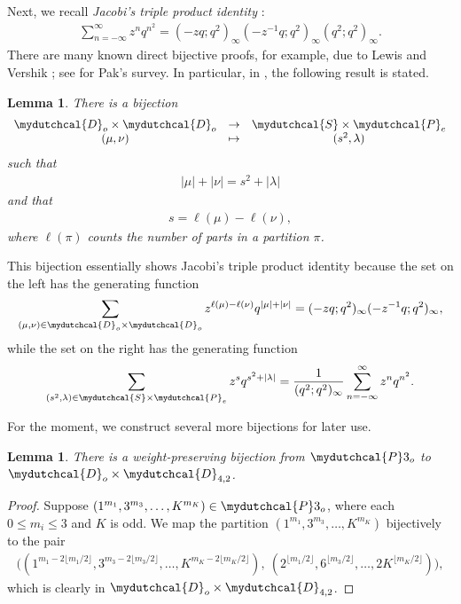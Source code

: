 \documentclass[12pt,reqno]{amsart}
\numberwithin{equation}{section}
\theoremstyle{plain}
\newtheorem{lemma}[theorem]{Lemma}
\theoremstyle{definition}
\theoremstyle{named}
\newcommand{\cP}{\mydutchcal{P}}
\newcommand{\cD}{\mydutchcal{D}}
\newcommand{\cS}{\mydutchcal{S}}
\begin{document}
Next, we recall \emph{Jacobi's triple product identity} \cite[p.~21, eq.~(2.2.10)]{And1998}:  
\begin{align*}
	\sum_{n=-\infty}^\infty z^n q^{n^2} = (-zq;q^2)_\infty(-z^{-1}q;q^2)_\infty(q^2;q^2)_\infty.
\end{align*}
There are many known direct bijective proofs, for example, due to Lewis \cite{Lew1984} and Vershik \cite{Ver1988}; see \cite[Sect.~6.2]{Pak2006} for Pak's survey. In particular, 
in \cite[Sect.~6.2.2]{Pak2006}, the following result is stated.

\begin{lemma}\label{lemma:theta}
	There is a bijection
	\begin{align*}
		\begin{array}{ccc}
			\cD_{o}\times \cD_{o} & \to & \cS\times \cP_{e}\\
			(\mu,\nu) & \mapsto & (s^2,\lambda)
		\end{array}
	\end{align*}
	such that
	\begin{align*}
		|\mu|+|\nu|=s^2+|\lambda|
	\end{align*}
	and that
	\begin{align*}
		s=\ell(\mu)-\ell(\nu),
	\end{align*}
	where $\ell(\pi)$ counts the number of parts in a partition $\pi$.
\end{lemma}

This bijection essentially shows Jacobi's triple product identity because the set on the left has the generating function
\begin{align*}
	\sum_{(\mu,\nu)\in \cD_{o}\times \cD_{o}}z^{\ell(\mu)-\ell(\nu)}q^{|\mu|+|\nu|} = (-zq;q^2)_\infty(-z^{-1}q;q^2)_\infty,
\end{align*}
while the set on the right has the generating function
\begin{align*}
	\sum_{(s^2,\lambda)\in \cS\times \cP_{e}}z^{s}q^{s^2+|\lambda|} = \frac{1}{(q^2;q^2)_\infty}\sum_{n=-\infty}^\infty z^n q^{n^2}.
\end{align*}

For the moment, we construct several more bijections for later use.

\begin{lemma}\label{lemma:splitP3o}
	There is a weight-preserving bijection from $\cP3_{o}$ to $\cD_{o} \times \cD_{4,2}$.
\end{lemma}

\begin{proof}
	Suppose 
	$(1^{m_1},3^{m_3}, \dots, K^{m_K}) \in \cP3_o$, where each $0 \leq m_i \leq 3$ and $K$ is odd. We map the partition $(1^{m_1},3^{m_3}, \dots, K^{m_K})$ bijectively to the pair
	\begin{align*}
		\big((1^{m_1 - 2\lfloor m_1/2 \rfloor},3^{m_3 - 2\lfloor m_3/2 \rfloor}, \dots, K^{m_K-2\lfloor m_K/2 \rfloor}), \ (2^{\lfloor m_1/2 \rfloor},6^{\lfloor m_3/2 \rfloor},\dots, 2K^{\lfloor m_K/2 \rfloor})\big),
	\end{align*}
	which is clearly in $\cD_{o} \times \cD_{4,2}$.
\end{proof}
\end{document}
